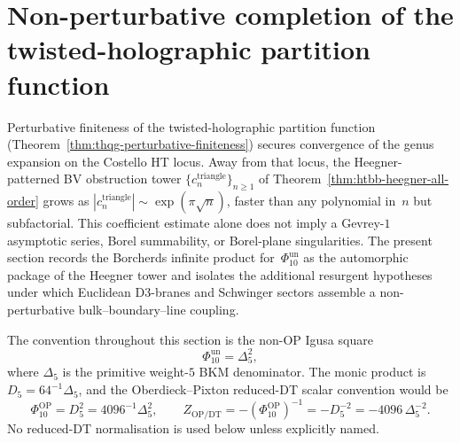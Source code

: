%

\section{Non-perturbative completion of the twisted-holographic partition function}
\label{sec:thqg-nonperturbative}
\label{ch:thqg-nonperturbative}

\providecommand{\HS}{\operatorname{HS}}
\providecommand{\Tr}{\operatorname{Tr}}
\providecommand{\Det}{\operatorname{Det}}
\providecommand{\vol}{\operatorname{vol}}
\providecommand{\Res}{\operatorname{Res}}
\providecommand{\rig}{\mathrm{rig}}

Perturbative finiteness of the twisted-holographic partition function
(Theorem~\ref{thm:thqg-perturbative-finiteness}) secures convergence
of the genus expansion on the Costello HT locus. Away from that locus,
the Heegner-patterned BV obstruction tower
$\{c_n^{\mathrm{triangle}}\}_{n\geq 1}$ of
Theorem~\ref{thm:htbb-heegner-all-order} grows as
$|c_n^{\mathrm{triangle}}|\sim\exp(\pi\sqrt n)$, faster than any
polynomial in~$n$ but subfactorial. This coefficient estimate alone
does not imply a Gevrey-$1$ asymptotic series, Borel summability, or
Borel-plane singularities. The present section records the
Borcherds infinite product for~$\Phi_{10}^{\mathrm{un}}$ as the automorphic package
of the Heegner tower and isolates the additional resurgent hypotheses
under which Euclidean D$3$-branes and Schwinger sectors assemble a
non-perturbative bulk--boundary--line coupling.

The convention throughout this section is the non-OP Igusa square
\[
 \Phi_{10}^{\mathrm{un}}=\Delta_5^2,
\]
where \(\Delta_5\) is the primitive weight-\(5\) BKM denominator.  The
monic product is \(D_5=64^{-1}\Delta_5\), and the
Oberdieck--Pixton reduced-DT scalar convention would be
\[
 \Phi_{10}^{\mathrm{OP}}=D_5^2=4096^{-1}\Delta_5^2,\qquad
 Z_{\mathrm{OP/DT}}=-(\Phi_{10}^{\mathrm{OP}})^{-1}
 =-D_5^{-2}=-4096\,\Delta_5^{-2}.
\]
No reduced-DT normalisation is used below unless explicitly named.

